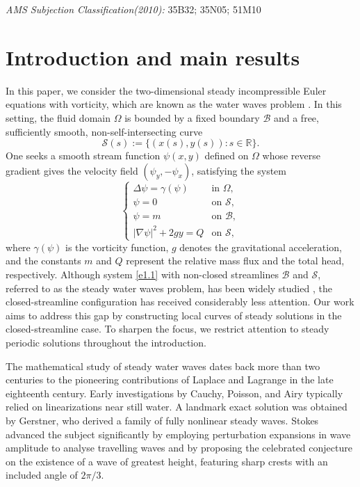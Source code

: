 \documentclass[reqno]{amsart}
\numberwithin{equation}{section}
\numberwithin{equation}{section}
\numberwithin{equation}{section}
\begin{document}
\noindent \emph{AMS Subjection Classification(2010):} 35B32; 35N05; 51M10


\section{Introduction and main results}

In this paper, we consider the two-dimensional steady incompressible Euler equations with vorticity, which are known as the water waves problem \cite[(2.1)--(2.2)]{ConstantinSV}. In this setting, the fluid domain \(\Omega\) is bounded by a fixed boundary \(\mathcal{B}\) and a free, sufficiently smooth, non-self-intersecting curve
\[
\mathcal{S}(s) := \bigl\{ (x(s), y(s)) : s \in \mathbb{R} \bigr\}.
\]
One seeks a smooth stream function \(\psi(x,y)\) defined on \(\Omega\) whose reverse gradient gives the velocity field \((\psi_y, -\psi_x)\), satisfying the system
\begin{equation}\label{e1.1}
\begin{cases}
\Delta \psi = \gamma(\psi) & \text{in } \Omega, \\
\psi = 0 & \text{on } \mathcal{S}, \\
\psi = m & \text{on } \mathcal{B}, \\
|\nabla \psi|^2 + 2gy = Q & \text{on } \mathcal{S},
\end{cases}
\end{equation}
where \(\gamma(\psi)\) is the vorticity function, \(g\) denotes the gravitational acceleration, and the constants \(m\) and \(Q\) represent the relative mass flux and the total head, respectively. Although system \eqref{e1.1} with non-closed streamlines \(\mathcal{B}\) and \(\mathcal{S}\), referred to as the steady water waves problem, has been widely studied \cite{ConstantinS, ConstantinSV, ConstantinV, DaiZ, Varholm, Wahlen, WahlenW2}, the closed-streamline configuration has received considerably less attention. Our work aims to address this gap by constructing local curves of steady solutions in the closed-streamline case. To sharpen the focus, we restrict attention to steady periodic solutions throughout the introduction.

The mathematical study of steady water waves dates back more than two centuries to the pioneering contributions of Laplace and Lagrange in the late eighteenth century. Early investigations by Cauchy, Poisson, and Airy typically relied on linearizations near still water. A landmark exact solution was obtained by Gerstner, who derived a family of fully nonlinear steady waves. Stokes \cite{Stokes} advanced the subject significantly by employing perturbation expansions in wave amplitude to analyse travelling waves and by proposing the celebrated conjecture on the existence of a wave of greatest height, featuring sharp crests with an included angle of \(2\pi/3\).
\end{document}
